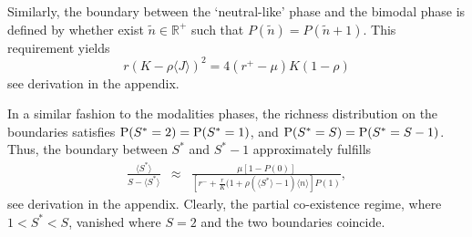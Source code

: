 \documentclass[%
 amsmath,amssymb,
reprint,%
linenumbers]{revtex4-2}
\begin{document}
Similarly, the boundary between the `neutral-like' phase and the bimodal phase is defined by whether exist $\tilde{n} \in {\mathbb R}^+ $ such that 
$
    P(\tilde{n})=P(\tilde{n}+1)
$.
This requirement yields
\begin{equation}
r(K-\rho \langle J\rangle )^2=4(r^+-\mu){K(1-\rho)} 
\end{equation}
see derivation in the appendix.

In a similar fashion to the modalities phases, the richness distribution on the boundaries satisfies  ${\rm P}(S^*=2)={\rm P}(S^*=1)$, and ${\rm P}(S^*=S)={\rm P}(S^*=S-1)$. Thus, the boundary between $S^*$ and $S^*-1$ approximately fulfills
\begin{eqnarray}
\frac{\langle S^* \rangle }{S-\langle S^* \rangle} 
    &\approx&\frac{\mu[1-P(0)]}{ [r^-+\frac{r}{K}(1+\rho (\langle S^* \rangle-1)\langle n \rangle] P(1)},
\end{eqnarray}
see derivation in the appendix.
Clearly, the partial co-existence regime, where $1<S^*<S$, vanished where $S=2$ and the two boundaries coincide. 



\end{document}
